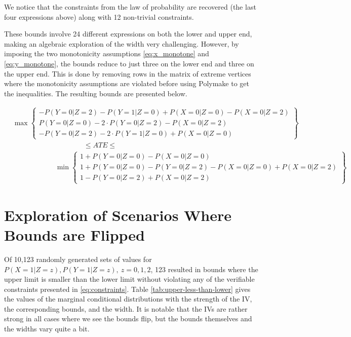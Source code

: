 \documentclass[
]{article}
\theoremstyle{plain}
\begin{document}
We notice that the constraints from the law of probability are recovered (the last four expressions above) along with 12 non-trivial constraints.

These bounds involve 24 different expressions on both the lower and upper end, making an algebraic exploration of the width very challenging. However, by imposing the two monotonicity assumptions \eqref{eq:x_monotone} and \eqref{eq:y_monotone}, the bounds reduce to just three on the lower end and three on the upper end. This is done by removing rows in the matrix of extreme vertices where the monotonicity assumptions are violated before using Polymake to get the inequalities. The resulting bounds are presented below.

\[
\begin{aligned}
    &\max
      \begin{Bmatrix}
        -P(Y = 0 | Z = 2) - P(Y = 1 | Z = 0) + P(X = 0 | Z = 0) - P(X = 0 | Z = 2) \\
        P(Y = 0 | Z = 0) - 2\cdot P(Y = 0 | Z = 2) - P(X = 0 | Z = 2) \\
        -P(Y = 0 | Z = 2) - 2\cdot P(Y = 1 | Z = 0) + P(X = 0 | Z = 0)
      \end{Bmatrix} \\
    &\qquad \qquad \qquad \qquad \qquad\le ATE \le \\
    &\qquad \qquad \qquad \min
      \begin{Bmatrix}
        1 + P(Y = 0 | Z = 0) - P(X = 0 | Z = 0) \\
        1 + P(Y = 0 | Z = 0) - P(Y = 0 | Z = 2) - P(X = 0 | Z = 0) + P(X = 0 | Z = 2) \\
        1 - P(Y = 0 | Z = 2) +  P(X = 0 | Z = 2)
      \end{Bmatrix}
\end{aligned}
\]

\hypertarget{exploration-of-scenarios-where-bounds-are-flipped}{%
\section{\texorpdfstring{Exploration of Scenarios Where Bounds are Flipped \label{improper-bounds}}{Exploration of Scenarios Where Bounds are Flipped }}\label{exploration-of-scenarios-where-bounds-are-flipped}}

Of 10,123 randomly generated sets of values for \(P(X = 1 | Z = z), P(Y = 1 | Z = z),\ z = 0,1,2\), 123 resulted in bounds where the upper limit is smaller than the lower limit without violating any of the verifiable constraints presented in \eqref{eq:constraints}. Table \ref{tab:upper-less-than-lower} gives the values of the marginal conditional distributions with the strength of the IV, the corresponding bounds, and the width. It is notable that the IVs are rather strong in all cases where we see the bounds flip, but the bounds themselves and the widths vary quite a bit.
\end{document}
